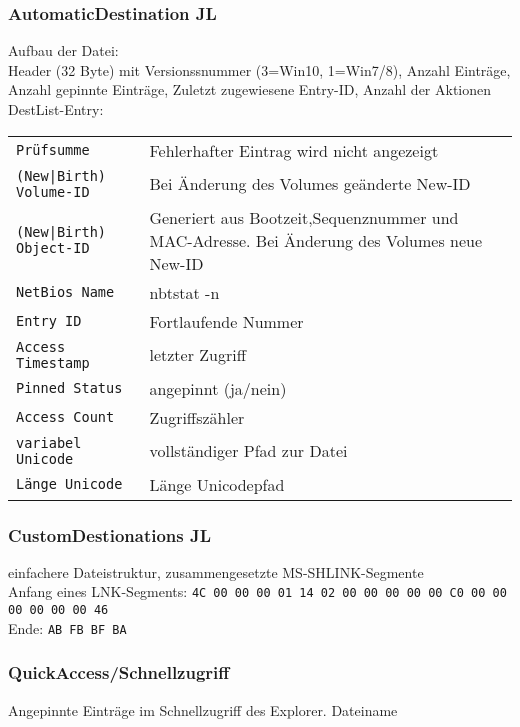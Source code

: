 \subsubsection{AutomaticDestination JL}
Aufbau der Datei:\\
Header (32 Byte) mit Versionssnummer (3=Win10, 1=Win7/8), Anzahl Einträge, Anzahl gepinnte Einträge, Zuletzt zugewiesene Entry-ID, Anzahl der Aktionen\\
DestList-Entry:\\
\begin{tabular}{@{}p{\the\MyLen}%
		@{}p{\linewidth-\the\MyLen}@{}}
	\texttt{Prüfsumme} &  Fehlerhafter Eintrag wird nicht angezeigt\\
	\texttt{(New|Birth) Volume-ID} &  Bei Änderung des Volumes geänderte New-ID\\
	\texttt{(New|Birth) Object-ID} &  Generiert aus Bootzeit,Sequenznummer und MAC-Adresse. Bei Änderung des Volumes neue New-ID\\
	\texttt{NetBios Name} & nbtstat -n\\
	\texttt{Entry ID} & Fortlaufende Nummer\\
	\texttt{Access Timestamp} & letzter Zugriff \\
	\texttt{Pinned Status} & angepinnt (ja/nein)\\
	\texttt{Access Count} & Zugriffszähler\\
	\texttt{variabel Unicode} & vollständiger Pfad zur Datei\\
	\texttt{Länge Unicode} & Länge Unicodepfad\\
\end{tabular}

\subsubsection{CustomDestionations JL}
einfachere Dateistruktur, zusammengesetzte MS-SHLINK-Segmente\\
Anfang eines LNK-Segments: \texttt{4C 00 00 00 01 14 02 00 00 00 00 00 C0 00 00 00 00 00 00 46}\\
Ende: \texttt{AB FB BF BA}

\subsubsection{QuickAccess/Schnellzugriff}
Angepinnte Einträge im Schnellzugriff des Explorer. Dateiname 

